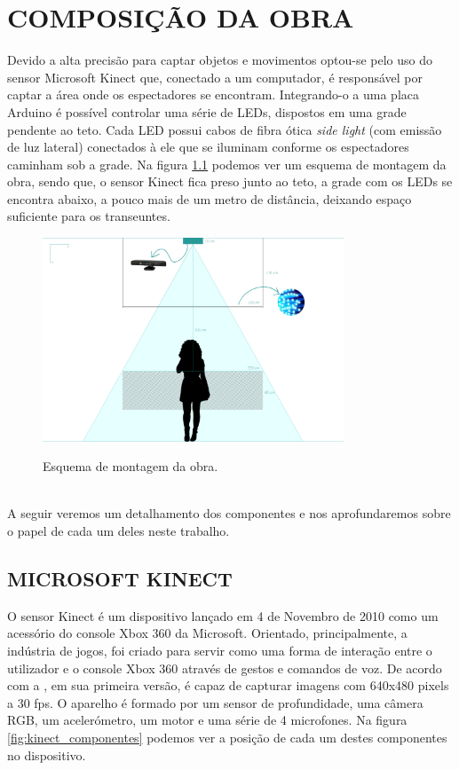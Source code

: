 \chapter{COMPOSIÇÃO DA OBRA}

Devido a alta precisão para captar objetos e movimentos optou-se pelo uso do sensor Microsoft Kinect que, conectado a um computador, é responsável por captar a área onde os espectadores se encontram. Integrando-o a uma placa Arduino é possível controlar uma série de LEDs, dispostos em uma grade pendente ao teto. Cada LED possui cabos de fibra ótica \textit{side light} (com emissão de luz lateral) conectados à ele que se iluminam conforme os espectadores caminham sob a grade. Na figura \ref{fig:esquema} podemos ver um esquema de montagem da obra, sendo que, o sensor Kinect fica preso junto ao teto, a grade com os LEDs se encontra abaixo, a pouco mais de um metro de distância, deixando espaço suficiente para os transeuntes.

\begin{figure}[H]
    \centering
    \caption{Esquema de montagem da obra.}
	\vspace*{0,2cm}
    \includegraphics[width=0.8\textwidth]{./04-figuras/esquema}
    \label{fig:esquema}
\end{figure}
\vspace*{-0,9cm}
{\raggedright {}}\\

A seguir veremos um detalhamento dos componentes e nos aprofundaremos sobre o papel de cada um deles neste trabalho. 

\section{MICROSOFT KINECT}

O sensor Kinect é um dispositivo lançado em 4 de Novembro de 2010 como um acessório do console Xbox 360 da Microsoft. Orientado, principalmente, a indústria de jogos, foi criado para servir como uma forma de interação entre o utilizador e o console Xbox 360 através de gestos e comandos de voz. De acordo com a , em sua primeira versão, é capaz de capturar imagens com 640x480 pixels a 30 fps. O aparelho é formado por um sensor de profundidade, uma câmera RGB, um acelerómetro, um motor e uma série de 4 microfones. Na figura \ref{fig:kinect_componentes} podemos ver a posição de cada um destes componentes no dispositivo.

